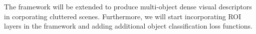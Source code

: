The framework will be extended to produce multi-object dense visual descriptors in corporating cluttered scenes.
Furthermore, we will start incorporating ROI layers in the framework and adding additional object classification loss functions.

